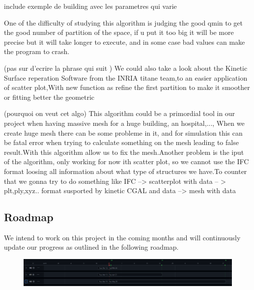 \documentclass{article}
\begin{document}
include exemple de building avec les parametres qui varie 





One of the difficulty of studying this algorithm is judging the good qmin to get the good number of partition of the space, if u put it too big it will be more precise 
but it will take longer to  execute, and in some case bad values can make the program to crash.

(pas sur d'ecrire la phrase qui suit )
We could also take a look about the Kinetic Surface reperation Software from the INRIA titane team,to an easier application of scatter plot,With new function as refine the first partition to make it smoother or fitting better the geometric


(pourquoi on veut cet algo)
This algorithm could be a primordial tool in our project when having massive mesh for a huge building, an hospital,..., When we create huge mesh there can be some probleme in it, and for simulation this can be fatal error 
when trying to calculate something on the mesh leading to false result.With this algorithm allow us to fix the mesh.Another problem is the iput of the algorithm, only working for now ith scatter plot, so we cannot use the IFC format
loosing all information about what type of structures we have.To counter that we gonna try to do something like IFC --> scatterplot with data  -- > plt,ply,xyz.. format susported by kinetic CGAL and data  --> mesh with data 


\subsection{Roadmap}
We intend to work on this project in the coming months and will continuously update our progress as outlined in the following roadmap.
\begin{figure}[h]
    
    \includegraphics[scale =   0.3 ]{../images/roadmap.png}
    
\end{figure}
    
\nocite{*}


\end{document}
